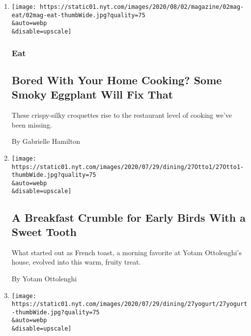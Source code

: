 \begin{enumerate}
\def\labelenumi{\arabic{enumi}.}
\item
  \href{/2020/07/29/magazine/bored-with-your-home-cooking-some-smoky-eggplant-will-fix-that.html}{}

  \texttt{[image: https://static01.nyt.com/images/2020/08/02/magazine/02mag-eat/02mag-eat-thumbWide.jpg?quality=75\\\&auto=webp\\\&disable=upscale]}

  \hypertarget{eat-}{%
  \subsubsection{Eat }\label{eat-}}

  \hypertarget{bored-with-your-home-cooking-some-smoky-eggplant-will-fix-that}{%
  \subsection{Bored With Your Home Cooking? Some Smoky Eggplant Will Fix
  That}\label{bored-with-your-home-cooking-some-smoky-eggplant-will-fix-that}}

  These crispy-silky croquettes rise to the restaurant level of cooking
  we've been missing.

  By Gabrielle Hamilton
\item
  \href{/2020/07/27/dining/breakfast-crumble-recipe.html}{}

  \texttt{[image: https://static01.nyt.com/images/2020/07/29/dining/27Otto1/27Otto1-thumbWide.jpg?quality=75\\\&auto=webp\\\&disable=upscale]}

  \hypertarget{a-breakfast-crumble-for-early-birds-with-a-sweet-tooth}{%
  \subsection{A Breakfast Crumble for Early Birds With a Sweet
  Tooth}\label{a-breakfast-crumble-for-early-birds-with-a-sweet-tooth}}

  What started out as French toast, a morning favorite at Yotam
  Ottolenghi's house, evolved into this warm, fruity treat.

  By Yotam Ottolenghi
\item
  \href{/2020/07/27/dining/cucumbers-yogurt-recipe.html}{}

  \texttt{[image: https://static01.nyt.com/images/2020/07/29/dining/27yogurt/27yogurt-thumbWide.jpg?quality=75\\\&auto=webp\\\&disable=upscale]}

  \hypertarget{finding-balance-in-a-summer-side}{%
}
\end{enumerate}
